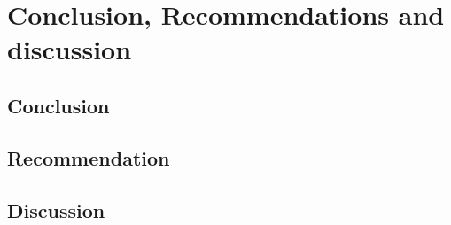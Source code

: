 \documentclass[12pt]{scrreprt}
\begin{document}
\chapter{Conclusion, Recommendations and discussion}
\section{Conclusion}
\section{Recommendation}



\section{Discussion}
\end{document}
